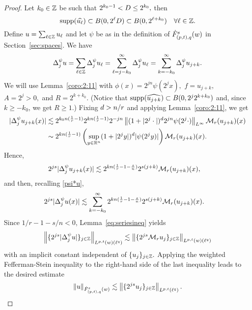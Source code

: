 {\begin{proof}
Let $k_0 \in \ent$ be such that $2^{k_0 -1} < \A\leq 2^{k_0},$ then  
$$
\supp(\widehat{u_\ell}) \subset B(0, 2^\ell \A) \subset B(0, 2^{\ell +k_0}) \quad \forall \ell \in \ent.
$$
Define $u =\sum_{\ell \in \ent} u_\ell$ and let $\psi$ be as in the definition of $\tlw{(p,t)}{s}{q}{w}$ in Section~\ref{sec:spaces}. We have
\begin{equation}\label{psi*u}
\Delta^\psi_j u = \sum_{\ell \in \ent} \Delta^\psi_j u_\ell = \sum_{\ell = j - k_0}^\infty \Delta^\psi_j  u_\ell = \sum_{k = - k_0}^\infty \Delta^\psi_j u_{j+k}.
\end{equation}
We will use Lemma~\ref{coro:2:11} with $\phi(x) =  2^{jn} \psi(2^j x),$  $f = u_{j+k},$  $A= 2^{j  } >0,$ and $R= 2^{k + k_0}.$ (Notice that $\supp(\widehat{u_{j+k}}) \subset  B(0, 2^{j} 2^{k + k_0})$ and, since $k \geq -k_0$, we get $R \geq 1$.) Fixing  $\ex>n/r$ and applying Lemma~\ref{coro:2:11}, we get
\begin{align*}
|\Delta^\psi_j  u_{j+k}(x)| & \lesssim   2^{k_0n(\frac{1}{r} -1)} 2^{k n (\frac{1}{r} -1)}  2^{-jn} \norm{(1 + |2^j \cdot|)^\ex 2^{jn}\psi (2^j\cdot)}{L^\infty}  \M_r(u_{j+k})(x)\\
& \sim  2^{k n (\frac{1}{r} -1)} \left( \sup_{y \in \rn} (1 + |2^j y|)^\ex |\psi(2^j y)|\right) \M_r(u_{j+k})(x).
\end{align*}
 Hence,
\begin{align*}
2^{js}|\Delta^\psi_j  u_{j+k}(x)| & \lesssim 2^{k n (\frac{1}{r} -1-\frac{s}{n})} 2^{s(j+k)}\M_r(u_{j+k})(x),
\end{align*}
and then, recalling \eqref{psi*u}, 
\begin{align*}
2^{js} |\Delta^\psi_j  u(x)| & \lesssim  \sum_{k =  - k_0}^\infty 2^{k n (\frac{1}{r} -1-\frac{s}{n})} 2^{s(j+k)}\M_r(u_{j+k})(x).
\end{align*}
Since $1/r -1-s/n < 0$,   Lemma~\ref{eq:seriesineq}  yields
$$
\norm{\{ 2^{js} |\Delta^\psi_j  u|\}_{j\in\ent}}{L^{p,t}(w)(\ell^{q})} \lesssim \norm{\{2^{js} \M_ru_j\}_{j\in\ent}}{L^{p,t}(w)(\ell^{q})}
$$
with an implicit constant independent of $\{u_j\}_{j\in \ent}.$
Applying the weighted  Fefferman-Stein inequality  to the right-hand side of the last inequality leads to the desired estimate
\begin{equation*}
\norm{u}{\tlw{(p,t)}{s}{q}{w}} \lesssim \norm{\{2^{js}u_j\}_{j\in\ent}}{L^{p,t}(\ell^{q})}.
\end{equation*}



\end{proof}}
